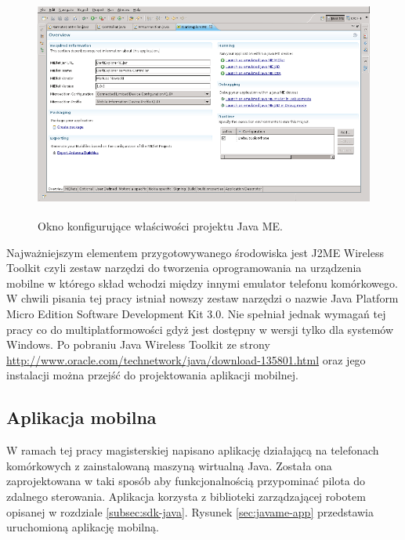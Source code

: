\begin{figure}[!ht]
 \centering \includegraphics[height=75mm]{../images/ch05/mobile_tools_4_j.png}
 \caption{Okno konfigurujące właściwości projektu Java ME.}
 \label{fig:MobTools4J}
\end{figure}

Najważniejszym elementem przygotowywanego środowiska jest J2ME Wireless Toolkit
czyli zestaw narzędzi do tworzenia oprogramowania na urządzenia mobilne w którego
skład wchodzi między innymi emulator telefonu komórkowego. W chwili pisania tej
pracy istniał nowszy zestaw narzędzi o nazwie Java Platform Micro Edition
Software Development Kit 3.0. Nie spełniał jednak wymagań tej pracy co do
multiplatformowości gdyż jest dostępny w wersji tylko dla systemów Windows. Po
pobraniu Java Wireless Toolkit ze strony
\url{http://www.oracle.com/technetwork/java/download-135801.html} oraz jego
instalacji można przejść do projektowania aplikacji mobilnej.

\subsection{Aplikacja mobilna}
W ramach tej pracy magisterskiej napisano aplikację działającą na telefonach
komórkowych z zainstalowaną maszyną wirtualną Java. Została ona zaprojektowana w
taki sposób aby funkcjonalnością przypominać pilota do zdalnego sterowania.
Aplikacja korzysta z biblioteki zarządzającej robotem opisanej w rozdziale
\ref{subsec:sdk-java}. Rysunek \ref{sec:javame-app} przedstawia uruchomioną aplikację mobilną.

